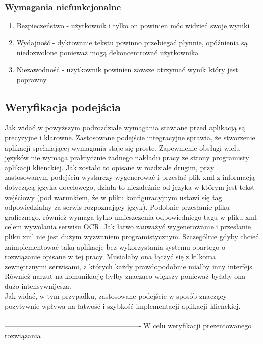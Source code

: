 \subsubsection{Wymagania niefunkcjonalne}
\begin{enumerate}
	\item Bezpieczeństwo - użytkownik i tylko on powinien móc widzieć swoje wyniki
	\item Wydajność - dyktowanie tekstu powinno przebiegać płynnie, opóźnienia są niedozwolone ponieważ mogą dekoncentrować użytkownika
	\item Niezawodność - użytkownik powinien zawsze otrzymać wynik który jest poprawny
\end{enumerate}

\subsection{Weryfikacja podejścia}
Jak widać w powyższym podrozdziale wymagania stawiane przed aplikacją są precyzyjne i klarowne. Zastosowane podejście integracyjne sprawia, że stworzenie aplikacji spełniającej wymagania staje się proste. Zapewnienie obsługi wielu języków nie wymaga praktycznie żadnego nakładu pracy ze strony programisty aplikacji klienckiej. Jak zostało to opisane w rozdziale drugim, przy zastosowanym podejściu wystarczy wygenerować i przesłać plik xml z informacją dotyczącą języka docelowego, działa to niezależnie od języka w którym jest tekst wejściowy (pod warunkiem, że w pliku konfiguracyjnym ustawi się tag odpowiedzialny za serwis rozpoznający język). Podobnie przesłanie pliku graficznego, również wymaga tylko umieszczenia odpowiedniego tagu w pliku xml celem wywolania serwisu OCR. Jak łatwo zauważyć wygenerowanie i przesłanie pliku xml nie jest dużym wyzwaniem programistycznym. Szczególnie gdyby chcieć zaimplementować taką aplikację bez wykorzystania systemu opartego o rozwiązanie opisane w tej pracy. Musiałaby ona łączyć się z kilkoma zewnętrznymi serwisami, z których każdy prawdopodobnie miałby inny interfejs. Również narzut na komunikację byłby znacząco większy ponieważ byłaby ona dużo intensywnijesza. \\
Jak widać, w tym przypadku, zastosowane podejście w sposób znaczący pozytywnie wpływa na łatwość i szybkość implementacji aplikacji klienckiej. \\
 ----------------------------------------------------------------------------------------------------------------------------------------------------------------------
W celu weryfikacji prezentowanego rozwiązania 

